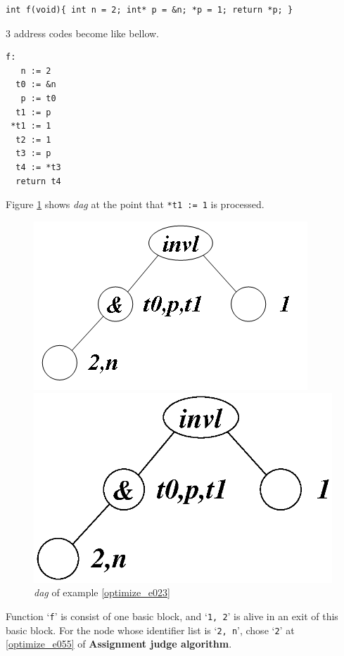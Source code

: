 \begin{Example}
\label{optimize_e023}
\begin{verbatim}
int f(void){ int n = 2; int* p = &n; *p = 1; return *p; }
\end{verbatim}
3 address codes become like bellow.
\begin{verbatim}
f:
   n := 2
  t0 := &n
   p := t0
  t1 := p
 *t1 := 1
  t2 := 1
  t3 := p
  t4 := *t3
  return t4
\end{verbatim}
Figure \ref{optimize_e024} shows {\em dag} at the point
that {\tt{*t1 := 1}} is processed.
\begin{figure}[htbp]
\begin{center}
\begin{htmlonly}
\includegraphics[width=0.7\linewidth,height=0.423\linewidth]{opt010.png}
\end{htmlonly}
\begin{latexonly}
\includegraphics[width=0.7\linewidth,height=0.423\linewidth]{opt010.eps}
\end{latexonly}
\caption{{\em dag} of example \ref{optimize_e023}}
\label{optimize_e024}
\end{center}
\end{figure}
Function `{\tt{f}}' is consist of one basic block, and 
`{\tt{1, 2}}' is alive in an exit of this basic block.
For the node whose identifier list is `{\tt{2, n}}',
chose `{\tt{2}}' at \ref{optimize_e055} of {\bf Assignment judge algorithm}.

\end{Example}
